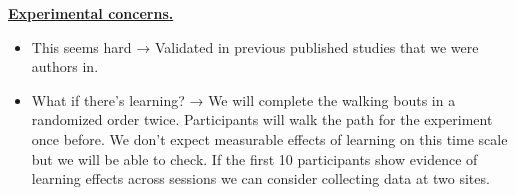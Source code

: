 \noindent \underline{\textbf{Experimental concerns.}}

\begin{itemize}
\item
  This seems hard → Validated in previous published studies that we were
  authors in.
\item
  What if there's learning? → We will complete the walking bouts in a
  randomized order twice. Participants will walk the path for the
  experiment once before. We don't expect measurable effects of learning
  on this time scale but we will be able to check. If the first 10
  participants show evidence of learning effects across sessions we can
  consider collecting data at two sites.
\end{itemize}
